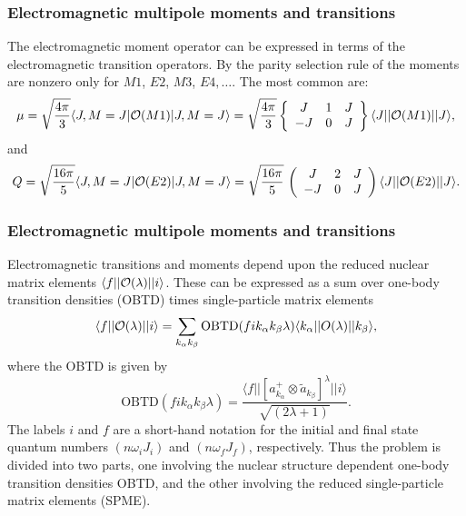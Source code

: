 \documentclass{beamer}
\begin{document}
\begin{frame}
\frametitle{Electromagnetic multipole moments and transitions}

\begin{block}{}
The 
electromagnetic moment operator can be expressed in terms of the
electromagnetic transition operators.
By the parity selection rule of the moments are nonzero
only for $M1$, $E2$, $M3$, $E4,\ldots$.
The most common are:
\[
\mu =\sqrt{\frac{4\pi }{3}}\langle J,M=J\vert {\cal O}(M1)\vert J,M=J\rangle= \sqrt{\frac{4\pi }{3}}\left\{\begin{array}{ccc} J & 1 &J \\  -J &  0 &  J \end{array}\right\}
\langle J\vert \vert {\cal O}(M1)\vert \vert J\rangle,
\]
and
\[
Q = \sqrt{\frac{16\pi }{5}}\langle J,M=J\vert {\cal O}(E2)\vert J,M=J\rangle= \sqrt{\frac{16\pi }{5}}\,
  \left(\begin{array}{ccc}  {J}&  {2} & {J}\\  {-J} & {0}&  {J}\end{array}\right)\langle J\vert\vert {\cal O}(E2)\vert\vert J\rangle.
\]
\end{block}
\end{frame}

\begin{frame}
\frametitle{Electromagnetic multipole moments and transitions}

\begin{block}{}
Electromagnetic transitions and moments depend upon the reduced nuclear
matrix elements $\langle f\vert\vert {\cal O}(\lambda )\vert\vert i\rangle$. These can be expressed as a sum over one-body transition
densities (OBTD) times single-particle matrix elements
\[
\langle f\vert\vert {\cal O}(\lambda )\vert\vert i\rangle
=\sum _{k_{\alpha } k_{\beta }}\mathrm{OBTD}(f i k_{\alpha } k_{\beta } \lambda )
 \langle k_{\alpha }\vert\vert O(\lambda )\vert\vert k_{\beta }\rangle, 
\]
where the OBTD is given by
\[
\mathrm{OBTD}(f i k_{\alpha} k_{\beta}\lambda)= \frac{\langle f\vert\vert [a^{+}_{k_{\alpha }}\otimes \tilde{a}_{k_{\beta }}]^{\lambda }\vert\vert i\rangle}{\sqrt{(2\lambda +1)}}. 
\]
The labels $i$ and $f$ are a short-hand notation for the initial
and final state quantum numbers $(n \omega _{i}J_{i})$ and $(n\omega_{f}J_{f})$,
respectively. Thus the problem is divided into two parts, one
involving the nuclear structure dependent one-body transition
densities OBTD, and the other involving the reduced
single-particle matrix
elements (SPME).
\end{block}
\end{frame}
\end{document}
